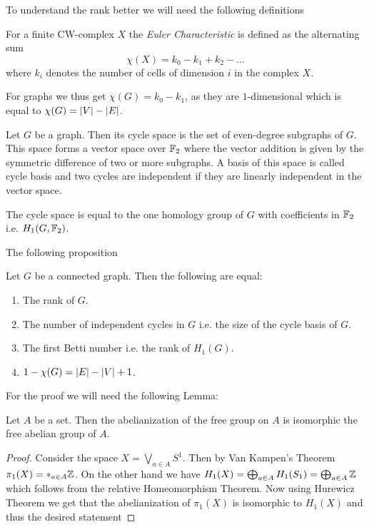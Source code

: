 To understand the rank better we will need the following definitions
\begin{definition}
	For a finite CW-complex $X$ the \emph{Euler Characteristic} is defined as the alternating sum
	\[
		\chi(X) = k_0 - k_1 + k_2 - \ldots
	\] 
	where $k_{i}$ denotes the number of cells of dimension $i$ in the complex $X$.
\end{definition}
For graphs we thus get $\chi (G) = k_0 - k_1$, as they are $1$-dimensional which is equal to $\chi(G) = \abs{V} - \abs{E}$.

\begin{definition}
	Let $G$ be a graph. Then its cycle space is the set of even-degree subgraphs of $G$. 
	This space forms a vector space over $\mathbb{F}_2$ where the vector addition is given by the symmetric difference of two or more subgraphs.
	A basis of this space is called cycle basis and two cycles are independent if they are linearly independent in the vector space.
\end{definition}

\begin{remark}
	The cycle space is equal to the one homology group of $G$ with coefficients in $\mathbb{F}_2$ i.e. $H_1(G,\mathbb{F}_2)$.
\end{remark}

The following proposition 
\begin{proposition}\label{prop:rank}
	Let $G$ be a connected graph. Then the following are equal:
	\begin{enumerate}
		\item The rank of $G$.
		\item The number of independent cycles in $G$ i.e. the size of the cycle basis of $G$.
		\item The first Betti number i.e. the rank of $H_{1}(G)$.
		\item $1 - \chi(G) = \abs{E} - \abs{V} + 1$.
	\end{enumerate}
\end{proposition}

For the proof we will need the following Lemma:
\begin{lemma}
	Let $A$ be a set. Then the abelianization of the free group on $A$ is isomorphic the free abelian group of $A$.
\end{lemma}

\begin{proof}
	Consider the space $X = \bigvee_{a \in A} S^{1}$. Then by Van Kampen's Theorem $\pi_1(X) = *_{a \in A} \mathbb{Z}$.
	On the other hand we have $H_1(X) = \bigoplus_{a \in A} H_1(S_1) = \bigoplus_{a \in A} \mathbb{Z}$ which follows from the relative Homeomorphism Theorem.
	Now using Hurewicz Theorem we get that the abelianization of $\pi_1(X)$ is isomorphic to $H_1(X)$ and thus the desired statement
\end{proof}

